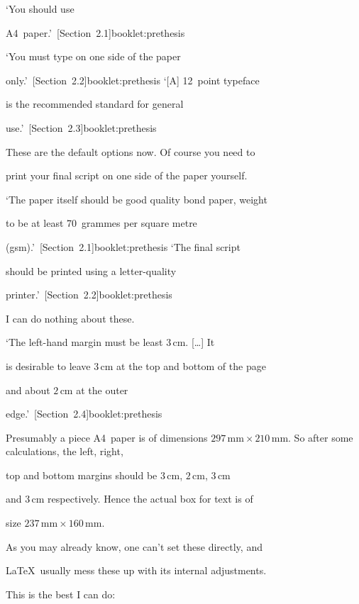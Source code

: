 \documentclass{bhamthesis}
\makeatletter
\renewcommand{\cite}{\@ifstar{\@ifstar{\HAR@acite}{\HAR@fcite}}{\HAR@acite}}
\newcommand{\cm}{\mathrm{cm}}
\newcommand{\mm}{\mathrm{mm}}
\newcommand{\solnmark}{\textasteriskcentered}
\newcommand{\req}{\begin{singlespace}\small\item}
\newcommand{\soln}{\end{singlespace}\normalsize\item[\solnmark]}
\makeatother
\begin{document}
\begin{itemize}

\req `You should use

  A4~paper.'~\cite[Section~2.1]{booklet:prethesis}

  `You must type on one side of the paper

  only.'~\cite[Section~2.2]{booklet:prethesis} `[A] 12~point typeface

  is the recommended standard for general

  use.'~\cite[Section~2.3]{booklet:prethesis}

\soln These are the default options now.  Of course you need to

  print your final script on one side of the paper yourself.



\req `The paper itself should be good quality bond paper, weight

  to be at least 70~gram\-mes per square metre

  (gsm).'~\cite[Section~2.1]{booklet:prethesis}  `The final script

  should be printed using a letter-quality

  printer.'~\cite[Section~2.2]{booklet:prethesis}

\soln I can do nothing about these.



\req `The left-hand margin must be least $3\,\cm$.  [\ldots]  It

  is desirable to leave $3\,\cm$ at the top and bottom of the page

  and about $2\,\cm$ at the outer

  edge.'~\cite[Section~2.4]{booklet:prethesis}

\soln Presumably a piece A4~paper is of dimensions $297\,\mm

  \times 210\,\mm$.  So after some calculations, the left, right,

  top and bottom margins should be $3\,\cm$, $2\,\cm$, $3\,\cm$

  and $3\,\cm$ respectively.  Hence the actual box for text is of

  size $237\,\mm \times 160\,\mm$.



  As you may already know, one can't set these directly, and

  \LaTeX\ usually mess these up with its internal adjustments.

  This is the best I can do:


\end{itemize}
\end{document}
